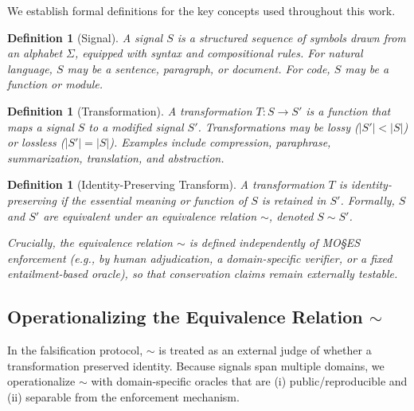 \documentclass[11pt,a4paper]{article}
\newtheorem{definition}[theorem]{Definition}
\begin{document}
We establish formal definitions for the key concepts used throughout this work.

\begin{definition}[Signal]
A signal $S$ is a structured sequence of symbols drawn from an alphabet $\Sigma$, equipped with syntax and compositional rules. For natural language, $S$ may be a sentence, paragraph, or document. For code, $S$ may be a function or module.
\end{definition}

\begin{definition}[Transformation]
A transformation $T: S \rightarrow S'$ is a function that maps a signal $S$ to a modified signal $S'$. Transformations may be lossy ($|S'| < |S|$) or lossless ($|S'| = |S|$). Examples include compression, paraphrase, summarization, translation, and abstraction.
\end{definition}

\begin{definition}[Identity-Preserving Transform]
A transformation $T$ is identity-preserving if the essential meaning or function of $S$ is retained in $S'$. Formally, $S$ and $S'$ are equivalent under an equivalence relation $\sim$, denoted $S \sim S'$.

Crucially, the equivalence relation $\sim$ is defined independently of MO\S{}ES\texttrademark{} enforcement (e.g., by human adjudication, a domain-specific verifier, or a fixed entailment-based oracle), so that conservation claims remain externally testable.
\end{definition}

\subsection{Operationalizing the Equivalence Relation \texorpdfstring{$\sim$}{sim}}
\label{sec:sim-operational}

In the falsification protocol, $\sim$ is treated as an external judge of whether a transformation preserved identity. Because signals span multiple domains, we operationalize $\sim$ with domain-specific oracles that are (i) public/reproducible and (ii) separable from the enforcement mechanism.
\end{document}
